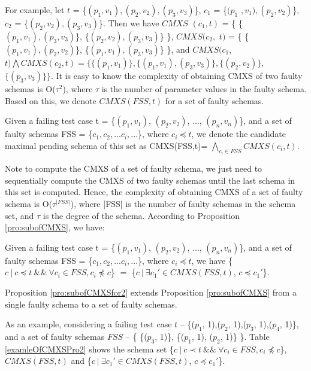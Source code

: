 \documentclass{sig-alternate-05-2015}
\begin{document}
For example, let $t$ = \{$(p_{1},v_{1}), (p_{2}, v_{2}), (p_{3}, v_{3})$\}, $c_{1}$ = \{$(p_{1}$ $, v_{1}), (p_{2}, v_{2})$\}, $c_{2}$ = \{$(p_{2}, v_{2}), (p_{3}, v_{3})$\}. Then we have $CMXS$ $(c_{1}, t)$ = \{ \{$(p_{1}, v_{1}), (p_{3}, v_{3})$\}, \{$(p_{2}, v_{2}), (p_{3}, v_{3})$\} \}, $CMXS(c_{2},$ $ t)$ = \{ \{$(p_{1}, v_{1}), (p_{2}, v_{2})$\}, \{$(p_{1}, v_{1}), (p_{3}, v_{3})$\} \}, and  $CMXS(c_{1},$ $ t) \bigwedge CMXS(c_{2}, t) = \{ \{(p_{1}, v_{1})\}, \{(p_{1}, v_{1}), (p_{3}, v_{3})\}, \{(p_{2}, v_{2})\}, $ $\{(p_{3}, v_{3})\} \} $. It is easy to know the complexity of obtaining CMXS of two faulty schemas is O($\tau^{2}$), where $\tau$ is the number of parameter values in the faulty schema. Based on this, we denote $CMXS(FSS,t)$ for a set of faulty schemas.

\begin{definition}
Given a failing test case t = \{$(p_{1}, v_{1})$, $(p_{2}, v_{2})$, ..., $(p_{n}, v_{n})$\}, and a set of faulty schemas FSS = \{$c_{1} , c_{2}, ... c_{i}, ...$\}, where $ c_{i} \preceq t$,  we denote the candidate maximal pending schema of this set as CMXS(FSS,t)= $\bigwedge_{c_{i}\in FSS} CMXS(c_{i}, t)$.
\end{definition}

Note to compute the CMXS of a set of faulty schema, we just need to sequentially compute the CMXS of two faulty schemas until the last schema in this set is computed. Hence, the complexity of obtaining CMXS of a set of faulty schema is O($\tau^{|FSS|}$), where |FSS| is the number of faulty schemas in the schema set, and $\tau$ is the degree of the schema. According to Proposition \ref{pro:subofCMXS}, we have:

\begin{proposition}\label{pro:subofCMXSfor2}
Given a failing test case t = \{$(p_{1}, v_{1})$, $(p_{2}, v_{2})$, ..., $(p_{n}, v_{n})$\}, and a set of faulty schemas FSS = \{$c_{1} , c_{2}, ... c_{i}, ...$\}, where $ c_{i} \preceq t$,  we have \{$c\ |\ c \preceq t\ \&\&\ \forall c_{i} \in FSS, c_{i} \npreceq c $\} $=$  \{$ c\ |\ \exists c_{1}' \in CMXS(FSS, t)$, $c \preceq c_{1}'$\}.
\end{proposition}

Proposition \ref{pro:subofCMXSfor2} extends Proposition \ref{pro:subofCMXS} from a single faulty schema to a set of faulty schemas.

As an example, considering a failing test case $t$ -- \{($p_{1}$, 1),($p_{2}$, 1),($p_{3}$, 1),($p_{4}$, 1)\}, and a set of faulty schemas  $FSS$ -- \{ \{($p_{3}$, 1)\},  \{($p_{1}$, 1), ($p_{2}$, 1)\} \}. Table \ref{examleOfCMXSPro2} shows the schema set \{$c\ |\ c \prec t\ \&\&\ \forall c_{i} \in FSS, c_{i} \npreceq c $\}, $CMXS(FSS, t)$ and \{$ c\ |\ \exists c_{1}' \in CMXS(FSS, t)$, $c \preceq c_{1}'$\}.
\end{document}
